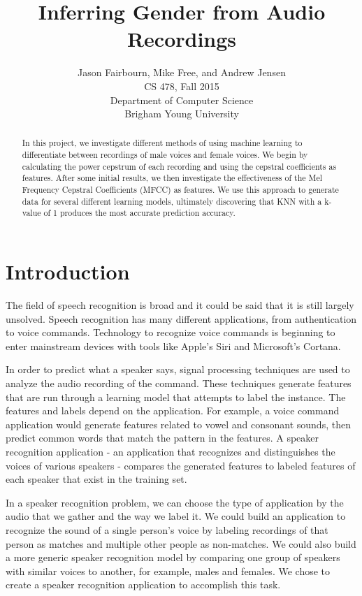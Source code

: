 \documentclass{article}
\title{Inferring Gender from Audio Recordings}
\author{Jason Fairbourn, Mike Free, and Andrew Jensen \\
CS 478, Fall 2015\\
Department of Computer Science\\
Brigham Young University}
\begin{document}
\maketitle

\begin{abstract}
In this project, we investigate different methods of using machine learning to differentiate between recordings of male voices and female voices.  We begin by calculating the power cepstrum of each recording and using the cepstral coefficients as features.  After some initial results, we then investigate the effectiveness of the Mel Frequency Cepstral Coefficients (MFCC) as features.  We use this approach to generate data for several different learning models, ultimately discovering that KNN with a k-value of 1 produces the most accurate prediction accuracy.
\end{abstract}

\section{Introduction}

The field of speech recognition is broad and it could be said that it is still largely unsolved. Speech recognition has many different applications, from authentication to voice commands. Technology to recognize voice commands is beginning to enter mainstream devices with tools like Apple's Siri and Microsoft's Cortana.

In order to predict what a speaker says, signal processing techniques are used to analyze the audio recording of the command. These techniques generate features that are run through a learning model that attempts to label the instance. The features and labels depend on the application. For example, a voice command application would generate features related to vowel and consonant sounds, then predict common words that match the pattern in the features. A speaker recognition application - an application that recognizes and distinguishes the voices of various speakers - compares the generated features to labeled features of each speaker that exist in the training set.

In a speaker recognition problem, we can choose the type of application by the audio that we gather and the way we label it. We could build an application to recognize the sound of a single person’s voice by labeling recordings of that person as matches and multiple other people as non-matches. We could also build a more generic speaker recognition model by comparing one group of speakers with similar voices to another, for example, males and females. We chose to create a speaker recognition application to accomplish this task.
\end{document}
